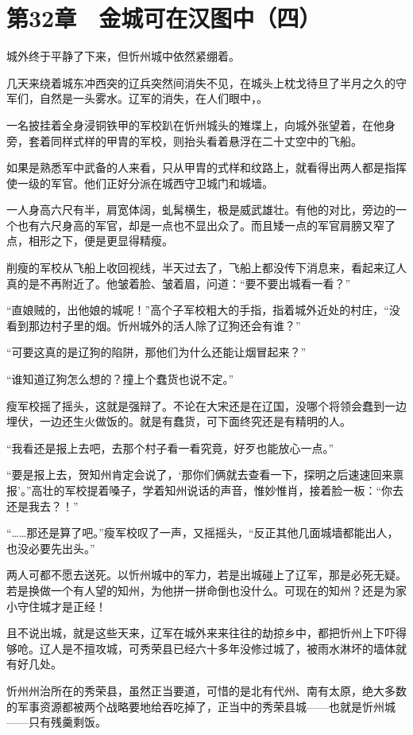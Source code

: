 \section{第32章　金城可在汉图中（四）}

城外终于平静了下来，但忻州城中依然紧绷着。

几天来绕着城东冲西突的辽兵突然间消失不见，在城头上枕戈待旦了半月之久的守军们，自然是一头雾水。辽军的消失，在人们眼中，。

一名披挂着全身浸铜铁甲的军校趴在忻州城头的雉堞上，向城外张望着，在他身旁，套着同样式样的甲胄的军校，则抬头看着悬浮在二十丈空中的飞船。

如果是熟悉军中武备的人来看，只从甲胄的式样和纹路上，就看得出两人都是指挥使一级的军官。他们正好分派在城西守卫城门和城墙。

一人身高六尺有半，肩宽体阔，虬髯横生，极是威武雄壮。有他的对比，旁边的一个也有六尺身高的军官，却是一点也不显出众了。而且矮一点的军官肩膀又窄了点，相形之下，便是更显得精瘦。

削瘦的军校从飞船上收回视线，半天过去了，飞船上都没传下消息来，看起来辽人真的是不再附近了。他皱着脸、皱着眉，问道：“要不要出城看一看？”

“直娘贼的，出他娘的城呢！”高个子军校粗大的手指，指着城外近处的村庄，“没看到那边村子里的烟。忻州城外的活人除了辽狗还会有谁？”

“可要这真的是辽狗的陷阱，那他们为什么还能让烟冒起来？”

“谁知道辽狗怎么想的？撞上个蠢货也说不定。”

瘦军校摇了摇头，这就是强辩了。不论在大宋还是在辽国，没哪个将领会蠢到一边埋伏，一边还生火做饭的。就是有蠢货，可下面终究还是有精明的人。

“我看还是报上去吧，去那个村子看一看究竟，好歹也能放心一点。”

“要是报上去，贺知州肯定会说了，‘那你们俩就去查看一下，探明之后速速回来禀报’。”高壮的军校提着嗓子，学着知州说话的声音，惟妙惟肖，接着脸一板：“你去还是我去？！”

“……那还是算了吧。”瘦军校叹了一声，又摇摇头，“反正其他几面城墙都能出人，也没必要先出头。”

两人可都不愿去送死。以忻州城中的军力，若是出城碰上了辽军，那是必死无疑。若是换做一个有人望的知州，为他拼一拼命倒也没什么。可现在的知州？还是为家小守住城才是正经！

且不说出城，就是这些天来，辽军在城外来来往往的劫掠乡中，都把忻州上下吓得够呛。辽人是不擅攻城，可秀荣县已经六十多年没修过城了，被雨水淋坏的墙体就有好几处。

忻州州治所在的秀荣县，虽然正当要道，可惜的是北有代州、南有太原，绝大多数的军事资源都被两个战略要地给吞吃掉了，正当中的秀荣县城——也就是忻州城——只有残羹剩饭。

